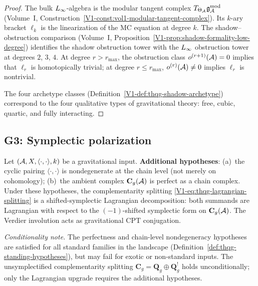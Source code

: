 \begin{proof}
The bulk $L_\infty$-algebra is the modular tangent complex
$T_{\Theta_{\mathcal{A}}}\mathfrak{g}_{\mathcal{A}}^{\mathrm{mod}}$ (Volume~I,
Construction~\ref{V1-const:vol1-modular-tangent-complex}). Its
$k$-ary bracket $\ell_k$ is the linearization of the MC equation
at degree $k$. The shadow--obstruction comparison
(Volume~I, Proposition~\ref{V1-prop:shadow-formality-low-degree})
identifies the shadow obstruction tower with the $L_\infty$ obstruction
tower at degrees $2$, $3$, $4$. At degree $r > r_{\max}$, the
obstruction class $o^{(r+1)}(\mathcal{A}) = 0$ implies that $\ell_r$ is
homotopically trivial; at degree $r \le r_{\max}$, $o^{(r)}(\mathcal{A}) \ne 0$
implies $\ell_r$ is nontrivial.

The four archetype classes (Definition~\ref{V1-def:thqg-shadow-archetype})
correspond to the four qualitative types of gravitational theory: free,
cubic, quartic, and fully interacting.
\end{proof}


\subsection{G3: Symplectic polarization}

\begin{theorem}
Let $(\mathcal{A}, X, \langle\cdot,\cdot\rangle, k)$ be a gravitational input.
\textbf{Additional hypotheses}: (a)~the cyclic pairing
$\langle\cdot,\cdot\rangle$ is nondegenerate at the chain level
(not merely on cohomology); (b)~the ambient complex $\mathbf{C}_g(\mathcal{A})$
is perfect as a chain complex.
Under these hypotheses, the complementarity splitting
\eqref{V1-eq:thqg-lagrangian-splitting} is a shifted-symplectic Lagrangian
decomposition: both summands are Lagrangian with respect to the
$(-1)$-shifted symplectic form on $\mathbf{C}_g(\mathcal{A})$. The Verdier
involution acts as gravitational CPT conjugation.

\smallskip\noindent
\textit{Conditionality note.}
The perfectness and chain-level nondegeneracy hypotheses are satisfied
for all standard families in the landscape
(Definition~\ref{def:thqg-standing-hypotheses}), but may fail for
exotic or non-standard inputs. The unsymplectified complementarity
splitting $\mathbf{C}_g = \mathbf{Q}_g \oplus \mathbf{Q}_g^!$ holds
unconditionally; only the Lagrangian upgrade requires the additional
hypotheses.
\end{theorem}

